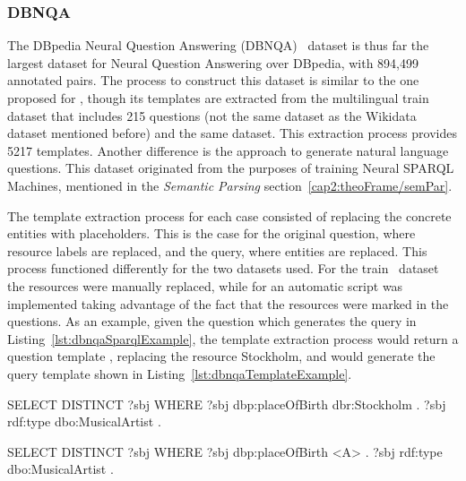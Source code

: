 \subsubsection{DBNQA}
\label{cap2:theoFrame/qakg/benchmarkDatasets/dbnqa}
The DBpedia Neural Question Answering (DBNQA)~\cite{dataset:dbnqa-hartmann-marx-soru-2018} dataset 
is thus far the largest dataset for Neural Question Answering over DBpedia, with 894,499 annotated 
pairs. The process to construct this dataset is similar to the one proposed for \LCQuADone{}, though its 
templates are extracted from the multilingual \QALDseven{} train dataset that includes 215 questions 
(not the same dataset as the Wikidata \QALDseven{} dataset mentioned before) and the same \LCQuADone 
dataset. This extraction process provides 5217 \SPARQL{} templates. Another difference is the 
approach to generate natural language questions. This dataset originated from the purposes of 
training Neural SPARQL Machines, mentioned in the \textit{Semantic Parsing} section~\ref{cap2:theoFrame/semPar}.

The template extraction process for each case consisted of replacing the concrete entities 
with placeholders. This is the case for the original question, where resource labels are 
replaced, and the query, where entities are replaced. This process functioned differently for 
the two datasets used. For the \QALDseven{} train~\cite{dataset:qald7-UsbeckNHKRN17} dataset the 
resources were manually replaced, while for \LCQuADone{} an automatic script was implemented taking 
advantage of the fact that the resources were marked in the questions. As an example, given the 
question  which generates the query 
in Listing~\ref{lst:dbnqaSparqlExample}, the template extraction process would return a 
question template , replacing the 
resource Stockholm, and would generate the query template shown in Listing~\ref{lst:dbnqaTemplateExample}.

\begin{sparqlcode}[%
    caption={\SPARQL{} query for the question: \dquotesit{What are the artists that are born in Stockholm?}.}, 
    label={lst:dbnqaSparqlExample}]
SELECT DISTINCT ?sbj WHERE {
    ?sbj dbp:placeOfBirth dbr:Stockholm .
    ?sbj rdf:type dbo:MusicalArtist .
}
\end{sparqlcode}

\begin{sparqlcode}[%
    caption={Query Template for the question: \dquotesit{What are the artists that are born in <A>?}.}, 
    label={lst:dbnqaTemplateExample}]
SELECT DISTINCT ?sbj WHERE {
    ?sbj dbp:placeOfBirth <A> .
    ?sbj rdf:type dbo:MusicalArtist .
}
\end{sparqlcode}

